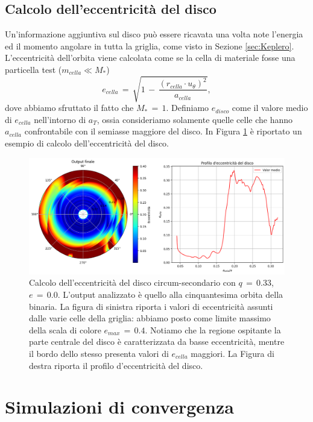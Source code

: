\subsection{Calcolo dell'eccentricità del disco}

Un'informazione aggiuntiva sul disco può essere ricavata una volta note l'energia ed il momento angolare in tutta la griglia, come visto in Sezione \ref{sec:Keplero}. L'eccentricità dell'orbita viene calcolata come se la cella di materiale fosse una particella test ($m_{cella} \ll M_\ast$) 
\begin{equation}
e_{cella}\,=\,\sqrt{1\,-\,\frac{(r_{cella}\cdot u_\theta)^2}{a_{cella}}},
\label{eq:ecc_cella}
\end{equation}
dove abbiamo sfruttato il fatto che $M_\ast\,=\,1$.
Definiamo $e_{disco}$ come il valore medio di $e_{cella}$ nell'intorno di $a_T$, ossia consideriamo solamente quelle celle che hanno $a_{cella}$ confrontabile con il semiasse maggiore del disco. In Figura \ref{fig:cal_ecc} è riportato un esempio di calcolo dell'eccentricità del disco.

\begin{figure}[h]
    \centering
    \includegraphics[width=\textwidth]{Immagini/Simulazioni/cal_ecc.png}
    \caption{Calcolo dell'eccentricità del disco circum-secondario con $q\,=\,0.33$, $e\,=\,0.0$. L'output analizzato è quello alla cinquantesima orbita della binaria. La figura di sinistra riporta i valori di eccentricità assunti dalle varie celle della griglia: abbiamo posto come limite massimo della scala di colore $e_{max}\,=\,0.4$. Notiamo che la regione ospitante la parte centrale del disco è caratterizzata da basse eccentricità, mentre il bordo dello stesso presenta valori di $e_{cella}$ maggiori. La Figura di destra riporta il profilo d'eccentricità del disco.}
    \label{fig:cal_ecc}
\end{figure}

\section{Simulazioni di convergenza}

